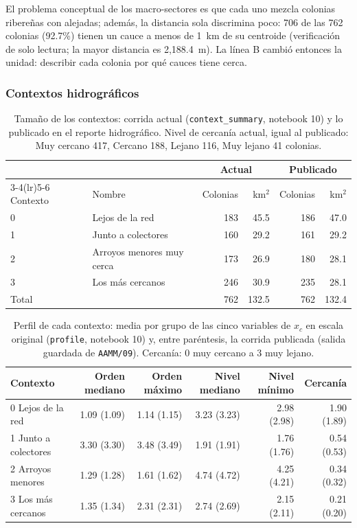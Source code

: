 \documentclass[11pt]{article}
\newcommand{\cod}[1]{\nolinkurl{#1}}
\begin{document}
El problema conceptual de los macro-sectores es que cada uno mezcla colonias ribereñas con alejadas; además, la distancia sola discrimina poco: 706 de las 762 colonias (92.7\%) tienen un cauce a menos de 1~km de su centroide (verificación de solo lectura; la mayor distancia es 2,188.4~m). La línea B cambió entonces la unidad: describir cada colonia por qué cauces tiene cerca.

\subsubsection*{Contextos hidrográficos}

\begin{table}[!htbp]
  \centering
  \small
  \caption{Tamaño de los contextos: corrida actual (\cod{context_summary}, notebook 10) y lo publicado en el reporte hidrográfico. Nivel de cercanía actual, igual al publicado: Muy cercano 417, Cercano 188, Lejano 116, Muy lejano 41 colonias.}
  \label{tab:ctx-tam}
  \begin{tabular}{llrrrr}
    \toprule
     & & \multicolumn{2}{c}{Actual} & \multicolumn{2}{c}{Publicado} \\
    \cmidrule(lr){3-4}\cmidrule(lr){5-6}
    Contexto & Nombre & Colonias & km$^2$ & Colonias & km$^2$ \\
    \midrule
    0 & Lejos de la red & 183 & 45.5 & 186 & 47.0 \\
    1 & Junto a colectores & 160 & 29.2 & 161 & 29.2 \\
    2 & Arroyos menores muy cerca & 173 & 26.9 & 180 & 28.1 \\
    3 & Los más cercanos & 246 & 30.9 & 235 & 28.1 \\
    \midrule
    Total & & 762 & 132.5 & 762 & 132.4 \\
    \bottomrule
  \end{tabular}
\end{table}

\begin{table}[!htbp]
  \centering
  \small
  \caption{Perfil de cada contexto: media por grupo de las cinco variables de $x_c$ en escala original (\cod{profile}, notebook 10) y, entre paréntesis, la corrida publicada (salida guardada de \cod{AAMM/09}). Cercanía: 0 muy cercano a 3 muy lejano.}
  \label{tab:ctx-perfil}
  \begin{tabular}{lrrrrr}
    \toprule
    Contexto & Orden mediano & Orden máximo & Nivel mediano & Nivel mínimo & Cercanía \\
    \midrule
    0 Lejos de la red & 1.09 (1.09) & 1.14 (1.15) & 3.23 (3.23) & 2.98 (2.98) & 1.90 (1.89) \\
    1 Junto a colectores & 3.30 (3.30) & 3.48 (3.49) & 1.91 (1.91) & 1.76 (1.76) & 0.54 (0.53) \\
    2 Arroyos menores & 1.29 (1.28) & 1.61 (1.62) & 4.74 (4.72) & 4.25 (4.21) & 0.34 (0.32) \\
    3 Los más cercanos & 1.35 (1.34) & 2.31 (2.31) & 2.74 (2.69) & 2.15 (2.11) & 0.21 (0.20) \\
    \bottomrule
  \end{tabular}
\end{table}
\end{document}
